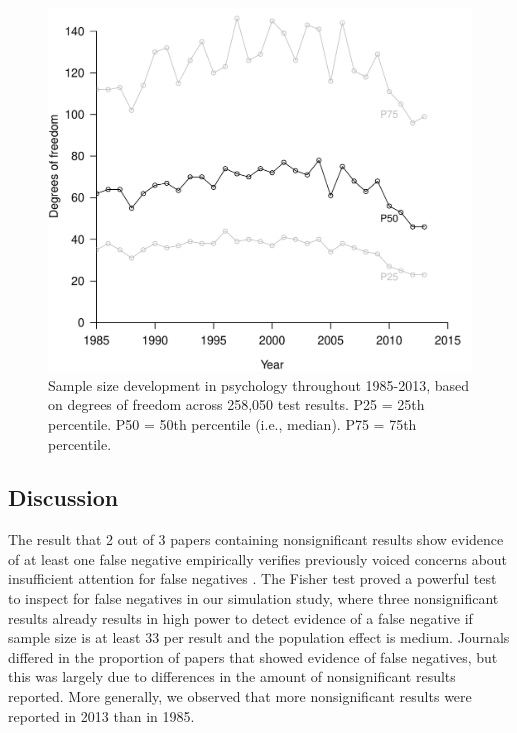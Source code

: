 \documentclass{article}
\begin{document}
\begin{figure}
\begin{center}
\includegraphics{../figures/Fig5.pdf}
\end{center}
\caption{Sample size development in psychology throughout 1985-2013, based on degrees of freedom across 258,050 test results. P25 = 25th percentile. P50 = 50th percentile (i.e., median). P75 = 75th percentile.}
\label{fig:fig5}
\end{figure}

\subsection*{Discussion}

The result that 2 out of 3 papers containing nonsignificant results show evidence of at least one false negative empirically verifies previously voiced concerns about insufficient attention for false negatives \cite{Fiedler2012-gx}. The Fisher test proved a powerful test to inspect for false negatives in our simulation study, where three nonsignificant results already results in high power to detect evidence of a false negative if sample size is at least 33 per result and the population effect is medium. Journals differed in the proportion of papers that showed evidence of false negatives, but this was largely due to differences in the amount of nonsignificant results reported. More generally, we observed that more nonsignificant results were reported in 2013 than in 1985. 
\end{document}
